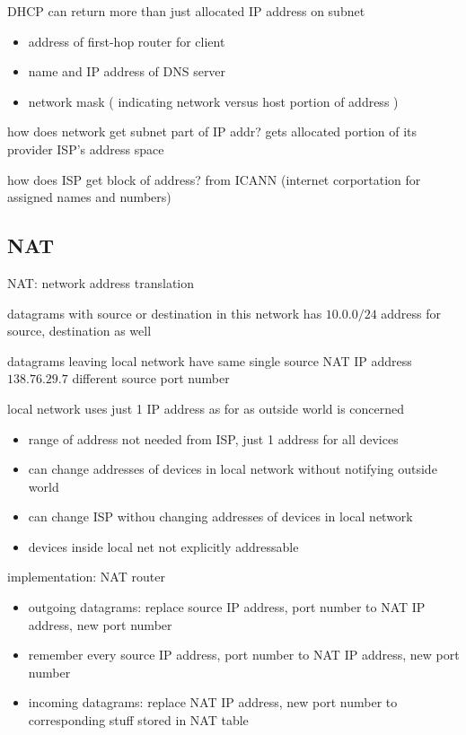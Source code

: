 \documentclass[10pt]{article}
\theoremstyle{break}
\begin{document}
DHCP can return more than just allocated IP address on subnet 
\begin{itemize}
    \item address of first-hop router for client 
    \item name and IP address of DNS server 
    \item network mask ( indicating network versus host portion of address )
\end{itemize}

how does network get subnet part of IP addr? gets allocated portion of its provider ISP's address space

how does ISP get block of address? from ICANN (internet corportation for assigned names and numbers)

\subsection{NAT}
NAT: network address translation

datagrams with source or destination in this network has $10.0.0/24$ address for source, destination as well 

datagrams leaving local network have same single source NAT IP address $138.76.29.7$ different source port number

local network uses just 1 IP address as for as outside world is concerned 

\begin{itemize}
    \item range of address not needed from ISP, just 1 address for all devices 
    \item can change addresses of devices in local network without notifying outside world 
    \item can change ISP withou changing addresses of devices in local network 
    \item devices inside local net not explicitly addressable 
\end{itemize}

implementation: NAT router 
\begin{itemize}
    \item outgoing datagrams: replace source IP address, port number to NAT IP address, new port number 
    \item remember every source IP address, port number to NAT IP address, new port number 
    \item incoming datagrams: replace NAT IP address, new port number to corresponding stuff stored in NAT table
\end{itemize}
\end{document}
